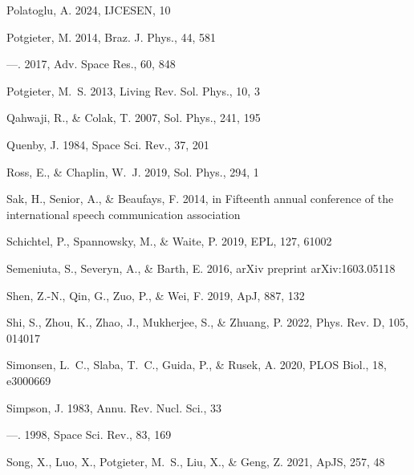 \documentclass[twocolumn,,12pt]{aastex631}
\begin{document}
\begin{thebibliography}{99}
Polatoglu, A. 2024, IJCESEN, 10

Potgieter, M. 2014, Braz. J. Phys., 44, 581

---. 2017, Adv. Space Res., 60, 848

Potgieter, M.~S. 2013, Living Rev. Sol. Phys., 10, 3

Qahwaji, R., \& Colak, T. 2007, Sol. Phys., 241, 195

Quenby, J. 1984, Space Sci. Rev., 37, 201

Ross, E., \& Chaplin, W.~J. 2019, Sol. Phys., 294, 1

Sak, H., Senior, A., \& Beaufays, F. 2014, in Fifteenth annual conference of
  the international speech communication association

Schichtel, P., Spannowsky, M., \& Waite, P. 2019, EPL, 127, 61002

Semeniuta, S., Severyn, A., \& Barth, E. 2016, arXiv preprint arXiv:1603.05118

Shen, Z.-N., Qin, G., Zuo, P., \& Wei, F. 2019, ApJ, 887, 132

Shi, S., Zhou, K., Zhao, J., Mukherjee, S., \& Zhuang, P. 2022, Phys. Rev. D,
  105, 014017

Simonsen, L.~C., Slaba, T.~C., Guida, P., \& Rusek, A. 2020, PLOS Biol., 18,
  e3000669

Simpson, J. 1983, Annu. Rev. Nucl. Sci., 33

---. 1998, Space Sci. Rev., 83, 169

Song, X., Luo, X., Potgieter, M.~S., Liu, X., \& Geng, Z. 2021, ApJS, 257, 48


\end{thebibliography}
\end{document}
